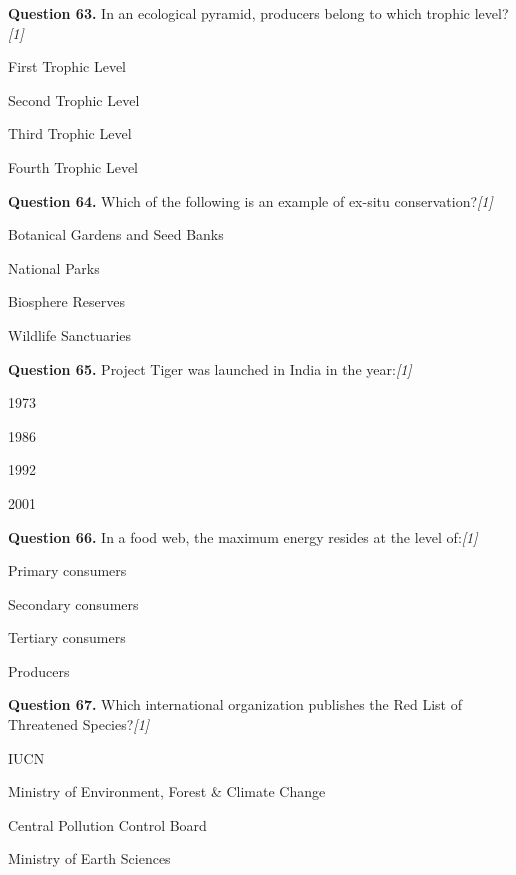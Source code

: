 \documentclass[11pt,a4paper]{article}
\newcommand{\pts}[1]{\hfill   \textit{[#1]}}
\begin{document}
\medskip


\noindent   \textbf{Question 63.} In an ecological pyramid, producers belong to which trophic level?\pts{1}

\begin{parts}
  \item First Trophic Level
  \item Second Trophic Level
  \item Third Trophic Level
  \item Fourth Trophic Level
\end{parts}

\medskip


\noindent   \textbf{Question 64.} Which of the following is an example of ex-situ conservation?\pts{1}

\begin{parts}
  \item Botanical Gardens and Seed Banks
  \item National Parks
  \item Biosphere Reserves
  \item Wildlife Sanctuaries
\end{parts}

\medskip


\noindent   \textbf{Question 65.} Project Tiger was launched in India in the year:\pts{1}

\begin{parts}
  \item 1973
  \item 1986
  \item 1992
  \item 2001
\end{parts}

\medskip


\noindent   \textbf{Question 66.} In a food web, the maximum energy resides at the level of:\pts{1}

\begin{parts}
  \item Primary consumers
  \item Secondary consumers
  \item Tertiary consumers
  \item Producers
\end{parts}

\medskip


\noindent   \textbf{Question 67.} Which international organization publishes the Red List of Threatened Species?\pts{1}

\begin{parts}
  \item IUCN
  \item Ministry of Environment, Forest & Climate Change
  \item Central Pollution Control Board
  \item Ministry of Earth Sciences
\end{parts}
\end{document}
